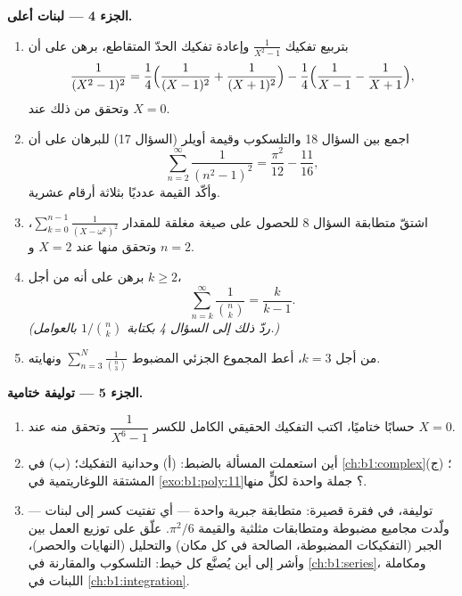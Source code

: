 \begin{problem}
\medskip
\noindent\textbf{الجزء 4 --- لبنات أعلى.}
\begin{enumerate}[resume]
  \item بتربيع تفكيك $\frac1{X^2-1}$ وإعادة تفكيك
        الحدّ المتقاطع، برهن على أن
        \[
        \frac1{(X^2-1)^2}
        = \frac14\Bigl(\frac1{(X-1)^2} + \frac1{(X+1)^2}\Bigr)
        - \frac14\Bigl(\frac1{X-1} - \frac1{X+1}\Bigr),
        \]
        وتحقق من ذلك عند $X = 0$.
  \item اجمع بين السؤال 18 والتلسكوب وقيمة أويلر
        (السؤال 17) للبرهان على أن
        \[
        \sum_{n=2}^{\infty}\frac1{(n^2-1)^2}
        = \frac{\pi^2}{12} - \frac{11}{16} ,
        \]
        وأكّد القيمة عدديًا بثلاثة أرقام عشرية.
  \item اشتقّ متطابقة السؤال 8 للحصول على
        صيغة مغلقة للمقدار $\sum_{k=0}^{n-1}\frac1{(X -
        \omega^k)^2}$، وتحقق منها عند $X = 2$ و $n = 2$.
  \item برهن على أنه من أجل $k \geq 2$،
        \[
        \sum_{n=k}^{\infty}\frac{1}{\binom nk} = \frac{k}{k-1} .
        \]
        \emph{(ردّ ذلك إلى السؤال 4 بكتابة $1/\binom nk$
        بالعوامل.)}
  \item من أجل $k = 3$، أعط المجموع الجزئي المضبوط
        $\sum_{n=3}^{N}\frac1{\binom n3}$ ونهايته.
\end{enumerate}

\medskip
\noindent\textbf{الجزء 5 --- توليفة ختامية.}
\begin{enumerate}[resume]
  \item حسابًا ختاميًا، اكتب التفكيك الحقيقي الكامل
        للكسر $\dfrac1{X^6 - 1}$ وتحقق منه عند $X =
        0$.
  \item أين استعملت المسألة بالضبط: (أ) وحدانية
        التفكيك؛ (ب)  في
        \cref{ch:b1:complex}؛ (ج) المشتقة اللوغاريتمية
        في \cref{exo:b1:poly:11}؟ جملة واحدة لكلٍّ منها.
  \item توليفة، في فقرة قصيرة: متطابقة جبرية واحدة
        --- أي تفتيت كسر إلى لبنات --- ولّدت مجاميع
        مضبوطة ومتطابقات مثلثية والقيمة $\pi^2/6$. علّق على
        توزيع العمل بين الجبر (التفكيكات
        المضبوطة، الصالحة في كل مكان) والتحليل (النهايات
        والحصر)، وأشر إلى أين يُصنَّع كل خيط:
        التلسكوب والمقارنة في
        \cref{ch:b1:series}، ومكاملة اللبنات في
        \cref{ch:b1:integration}.
\end{enumerate}
\end{problem}
